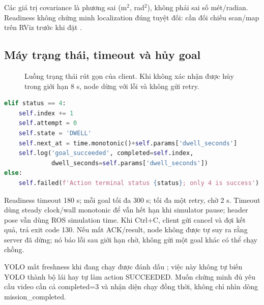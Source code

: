 Các giá trị covariance là phương sai (m$^2$, rad$^2$), không phải sai số mét/radian. Readiness không chứng minh localization đúng tuyệt đối: cần đối chiếu scan/map trên RViz trước khi đặt .
\clearpage

\subsection{Máy trạng thái, timeout và hủy goal}
\begin{figure}[H]\centering
{}
\caption[Máy trạng thái gửi goal tuần tự]{Luồng trạng thái rút gọn của client. Khi không xác nhận được hủy trong giới hạn 8 s, node dừng với lỗi và không gửi retry.}\label{fig:states}
\end{figure}
\begin{lstlisting}[language=Python,caption={Trích logic xử lý kết quả trong sequential\_navigation.py},label={lst:result}]
elif status == 4:
    self.index += 1
    self.attempt = 0
    self.state = 'DWELL'
    self.next_at = time.monotonic()+self.params['dwell_seconds']
    self.log('goal_succeeded', completed=self.index,
             dwell_seconds=self.params['dwell_seconds'])
else:
    self.failed(f'Action terminal status {status}; only 4 is success')
\end{lstlisting}
Readiness timeout 180 s; mỗi goal tối đa 300 s; tối đa một retry, chờ 2 s. Timeout dùng steady clock/wall monotonic để vẫn hết hạn khi simulator pause; header pose vẫn dùng ROS simulation time. Khi Ctrl+C, client gửi cancel và đợi kết quả, trả exit code 130. Nếu mất ACK/result, node không được tự suy ra rằng server đã dừng; nó báo lỗi sau giới hạn chờ, không gửi một goal khác có thể chạy chồng.

YOLO mất freshness khi đang chạy được đánh dấu ; việc này không tự biến YOLO thành bộ lái hay tự làm action SUCCEEDED. Muốn chứng minh đủ yêu cầu video cần cả completed=3 và nhận diện chạy đồng thời, không chỉ nhìn dòng mission\_completed.
